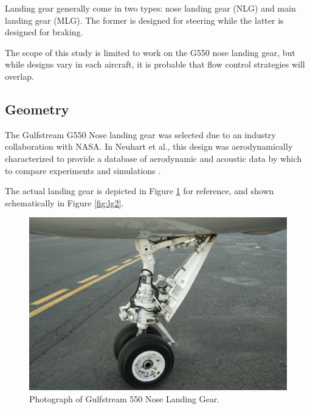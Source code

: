 Landing gear generally come in two types: nose landing gear (NLG) and main landing gear (MLG). The former is designed for steering while the latter is designed for braking. 

The scope of this study is limited to work on the G550 nose landing gear, but while designs vary in each aircraft, it is probable that flow control strategies will overlap. 

\subsection{Geometry}

The Gulfstream G550 Nose landing gear was selected due to an industry collaboration with NASA. In Neuhart et al., this design was aerodynamically characterized to provide a database of aerodynamic and acoustic data by which to compare experiments and simulations \cite{neuhart2009}.

The actual landing gear is depicted in Figure \ref{fig:lg1} for reference, and shown schematically in Figure \ref{fig:lg2}.



\begin{figure}
	\begin{center}
		\centerline{\includegraphics[scale=0.4]{figures/g550_nlg.pdf}}
		\caption{Photograph of Gulfstream 550 Nose Landing Gear.}
		\label{fig:lg1}
	\end{center}
\end{figure}

